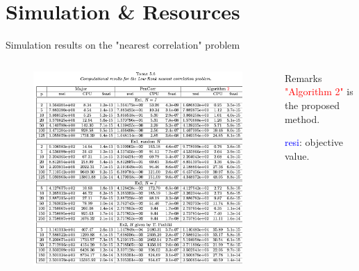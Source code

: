 \documentclass[aspectratio=43, 10pt]{beamer}
\begin{document}
\section{Simulation \& Resources}
    \begin{frame}[t]{Simulation results on the "nearest correlation" problem}
        \begin{columns}
        
            \begin{column}{0.6\textwidth}
            \vspace{-0.3cm}
                \begin{figure}
                        \includegraphics[width=1.0\textwidth]{figures/numerical.png}
                \end{figure}
            \end{column}

            \begin{column}{0.35\textwidth}
               \begin{block}{Remarks}
                    \textcolor{red}{"Algorithm 2"} is the proposed method. 
                        \vspace{0.3cm}
                        
                         \textcolor{blue}{resi}: objective value.
                         

\end{block}
\end{column}
\end{columns}
\end{frame}
\end{document}
